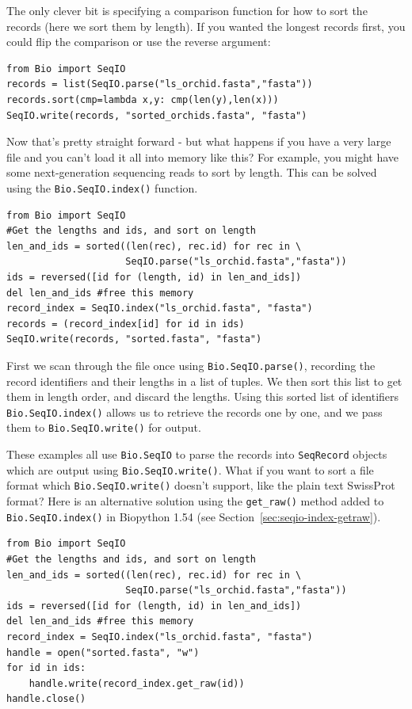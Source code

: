 \documentclass{report}
\begin{document}
The only clever bit is specifying a comparison function for how to
sort the records (here we sort them by length). If you wanted the
longest records first, you could flip the comparison or use the
reverse argument:

\begin{verbatim}
from Bio import SeqIO
records = list(SeqIO.parse("ls_orchid.fasta","fasta"))
records.sort(cmp=lambda x,y: cmp(len(y),len(x)))
SeqIO.write(records, "sorted_orchids.fasta", "fasta")
\end{verbatim}

Now that's pretty straight forward - but what happens if you have a
very large file and you can't load it all into memory like this?
For example, you might have some next-generation sequencing reads
to sort by length. This can be solved using the
\verb|Bio.SeqIO.index()| function.

\begin{verbatim}
from Bio import SeqIO
#Get the lengths and ids, and sort on length         
len_and_ids = sorted((len(rec), rec.id) for rec in \
                     SeqIO.parse("ls_orchid.fasta","fasta"))
ids = reversed([id for (length, id) in len_and_ids])
del len_and_ids	#free this memory
record_index = SeqIO.index("ls_orchid.fasta", "fasta")
records = (record_index[id] for id in ids)
SeqIO.write(records, "sorted.fasta", "fasta")
\end{verbatim}

First we scan through the file once using \verb|Bio.SeqIO.parse()|,
recording the record identifiers and their lengths in a list of tuples.
We then sort this list to get them in length order, and discard the lengths.
Using this sorted list of identifiers \verb|Bio.SeqIO.index()| allows us to
retrieve the records one by one, and we pass them to \verb|Bio.SeqIO.write()|
for output.

These examples all use \verb|Bio.SeqIO| to parse the records into
\verb|SeqRecord| objects which are output using \verb|Bio.SeqIO.write()|.
What if you want to sort a file format which \verb|Bio.SeqIO.write()| doesn't
support, like the plain text SwissProt format? Here is an alternative
solution using the \verb|get_raw()| method added to \verb|Bio.SeqIO.index()|
in Biopython 1.54 (see Section~\ref{sec:seqio-index-getraw}).

\begin{verbatim}
from Bio import SeqIO
#Get the lengths and ids, and sort on length         
len_and_ids = sorted((len(rec), rec.id) for rec in \
                     SeqIO.parse("ls_orchid.fasta","fasta"))
ids = reversed([id for (length, id) in len_and_ids])
del len_and_ids	#free this memory
record_index = SeqIO.index("ls_orchid.fasta", "fasta")
handle = open("sorted.fasta", "w")
for id in ids:
    handle.write(record_index.get_raw(id))
handle.close()
\end{verbatim}
\end{document}
